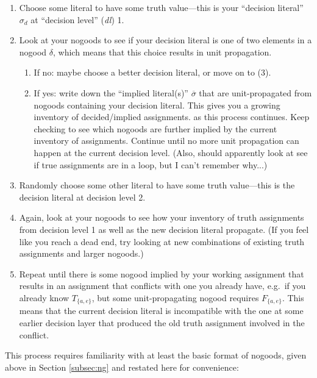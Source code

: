 \documentclass[9pt,a4paper,landscape]{article}
\newcommand{\ngtb}[1]{T_{ \{#1\} }}
\newcommand{\ngfb}[1]{F_{ \{#1\} }}
\begin{document}
{\begin{enumerate}[noitemsep]
	\item Choose some literal to have some truth value---this is your ``decision literal'' $\sigma_d$ at ``decision level'' (\textit{dl}) 1.
	\item Look at your nogoods to see if your decision literal is one of two elements in a nogood $\delta$, which means that this choice results in unit propagation.
	\begin{enumerate}[noitemsep]
		\item If no: maybe choose a better decision literal, or move on to (3).
		\item If yes: write down the ``implied literal(s)'' $\overline{\sigma}$ that are unit-propagated from nogoods containing your decision literal.
		This gives you a growing inventory of decided/implied assignments. as this process continues.
		Keep checking to see which nogoods are further implied by the current inventory of assignments. 
		Continue until no more unit propagation can happen at the current decision level.
		(Also, should apparently look at see if true assignments are in a loop, but I can't remember why...)
	\end{enumerate}
	\item Randomly choose some other literal to have some truth value---this is the decision literal at decision level 2.
	\item Again, look at your nogoods to see how your inventory of truth assignments from decision level 1 as well as the new decision literal propagate. (If you feel like you reach a dead end, try looking at new combinations of existing truth assignments and larger nogoods.)
	\item Repeat until there is some nogood implied by your working assignment that results in an assignment that conflicts with one you already have, e.g.\ if you already know $\ngtb{a, e}$, but some unit-propagating nogood requires $\ngfb{a, e}$.
	This means that the current decision literal is incompatible with the one at some earlier decision layer that produced the old truth assignment involved in the conflict.
\end{enumerate}

This process requires familiarity with at least the basic format of nogoods, given above in Section \ref{subsec:ng} and restated here for convenience:

\renewcommand{\arraystretch}{1}

}
\end{document}
